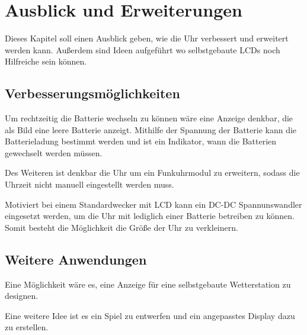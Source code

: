 \section{Ausblick und Erweiterungen}

Dieses Kapitel soll einen Ausblick geben, wie die Uhr verbessert und erweitert werden kann. Außerdem sind Ideen aufgeführt wo selbstgebaute LCDs noch Hilfreiche sein können.

\subsection{Verbesserungsmöglichkeiten}

Um rechtzeitig die Batterie wechseln zu können wäre eine Anzeige denkbar, die als Bild eine leere Batterie anzeigt. Mithilfe der Spannung der Batterie kann die Batterieladung bestimmt werden und ist ein Indikator, wann die Batterien gewechselt werden müssen.

Des Weiteren ist denkbar die Uhr um ein Funkuhrmodul zu erweitern, sodass die Uhrzeit nicht manuell eingestellt werden muss.

Motiviert bei einem Standardwecker mit LCD kann ein DC-DC Spannunswandler eingesetzt werden, um die Uhr mit lediglich einer Batterie betreiben zu können. Somit besteht die Möglichkeit die Größe der Uhr zu verkleinern.

\subsection{Weitere Anwendungen}

Eine Möglichkeit wäre es, eine Anzeige für eine selbstgebaute Wetterstation zu designen.

Eine weitere Idee ist es ein Spiel zu entwerfen und ein angepasstes Display dazu zu erstellen.
